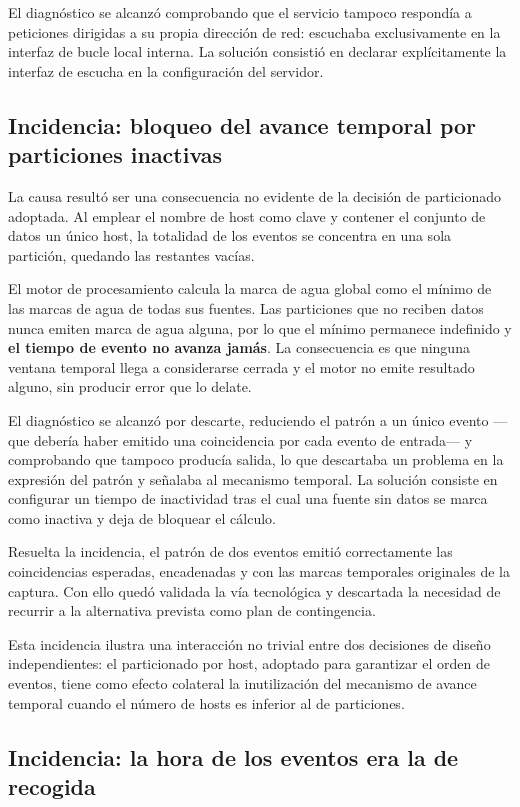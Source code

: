 El diagnóstico se alcanzó comprobando que el servicio tampoco respondía a peticiones dirigidas
a su propia dirección de red: escuchaba exclusivamente en la interfaz de bucle local interna.
La solución consistió en declarar explícitamente la interfaz de escucha en la configuración
del servidor.


\subsection{Incidencia: bloqueo del avance temporal por particiones inactivas}
\label{sec:incidencia_watermark}

La causa resultó ser una consecuencia no evidente de la decisión de particionado adoptada. Al
emplear el nombre de host como clave y contener el conjunto de datos un único host, la
totalidad de los eventos se concentra en una sola partición, quedando las restantes vacías.

El motor de procesamiento calcula la marca de agua global como el mínimo de las marcas de agua
de todas sus fuentes. Las particiones que no reciben datos nunca emiten marca de agua alguna,
por lo que el mínimo permanece indefinido y \textbf{el tiempo de evento no avanza jamás}. La
consecuencia es que ninguna ventana temporal llega a considerarse cerrada y el motor no emite
resultado alguno, sin producir error que lo delate.

El diagnóstico se alcanzó por descarte, reduciendo el patrón a un único evento —que debería
haber emitido una coincidencia por cada evento de entrada— y comprobando que tampoco producía
salida, lo que descartaba un problema en la expresión del patrón y señalaba al mecanismo
temporal. La solución consiste en configurar un tiempo de inactividad tras el cual una fuente
sin datos se marca como inactiva y deja de bloquear el cálculo.

Resuelta la incidencia, el patrón de dos eventos emitió correctamente las coincidencias
esperadas, encadenadas y con las marcas temporales originales de la captura. Con ello quedó
validada la vía tecnológica y descartada la necesidad de recurrir a la alternativa prevista
como plan de contingencia.

Esta incidencia ilustra una interacción no trivial entre dos decisiones de diseño
independientes: el particionado por host, adoptado para garantizar el orden de eventos, tiene
como efecto colateral la inutilización del mecanismo de avance temporal cuando el número de
hosts es inferior al de particiones.

\subsection{Incidencia: la hora de los eventos era la de recogida}


